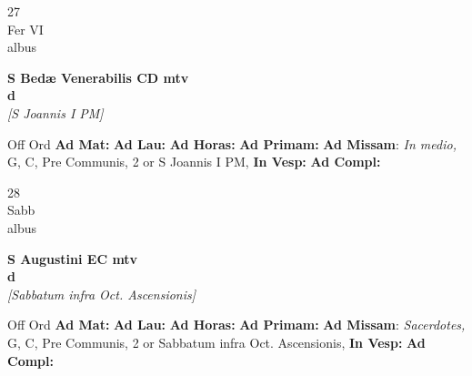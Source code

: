 \documentclass[10pt, openany]{book}
\begin{document}
        \begin{center}
            \begin{minipage}{3.5in}
                \vspace{2em}
                \begin{minipage}{0.5in}
                    {\Huge 27} \\
                    {\normalsize Fer VI} \\
                    {\normalsize albus}
                \end{minipage}
                \begin{minipage}{3.0in}
                    \textbf{ \large S Bedæ Venerabilis CD mtv \\
                    \textnormal{\normalsize d}} \\ \textit{[S Joannis I PM]} \\ 
                \end{minipage}
                \begin{justify}Off Ord
                    \textbf{Ad Mat: }
                    \textbf{Ad Lau: }
                    \textbf{Ad Horas: }
                    \textbf{Ad Primam: }\textbf{Ad Missam}: \textit{In medio,} G, C, Pre Communis, 2 or S Joannis I PM,  
                    \textbf{In Vesp: }
                    \textbf{Ad Compl: }
                \end{justify}
            \end{minipage}
        \end{center}
    
        \begin{center}
            \begin{minipage}{3.5in}
                \vspace{2em}
                \begin{minipage}{0.5in}
                    {\Huge 28} \\
                    {\normalsize Sabb} \\
                    {\normalsize albus}
                \end{minipage}
                \begin{minipage}{3.0in}
                    \textbf{ \large S Augustini EC mtv \\
                    \textnormal{\normalsize d}} \\ \textit{[Sabbatum infra Oct. Ascensionis]} \\ 
                \end{minipage}
                \begin{justify}Off Ord
                    \textbf{Ad Mat: }
                    \textbf{Ad Lau: }
                    \textbf{Ad Horas: }
                    \textbf{Ad Primam: }\textbf{Ad Missam}: \textit{Sacerdotes,} G, C, Pre Communis, 2 or Sabbatum infra Oct. Ascensionis,  
                    \textbf{In Vesp: }
                    \textbf{Ad Compl: }
                \end{justify}
            \end{minipage}
        \end{center}
    
\end{document}
